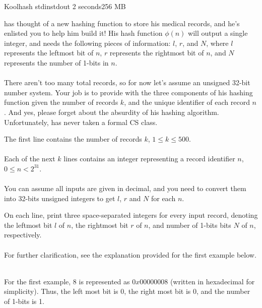 \begin{problem}{Koolhash}
{stdin}{stdout}
{2 seconds}{256 MB}{}

\T has thought of a new hashing function to store his medical records, and he's enlisted you to help him build it! His hash function $\phi(n)$ will output a single integer, and needs the following pieces of information: $l$, $r$, and $N$, where $l$ represents the leftmost bit of  $n$, $r$ represents the rightmost bit of $n$, and $N$ represents the number of 1-bits in $n$. \\ \\ 
There aren't too many total records, so for now let's assume an unsigned 32-bit number system. Your job is to provide \T with the three components of his hashing function given the number of records $k$, and the unique identifier of each record $n$. And yes, please forget about the absurdity of his hashing algorithm. Unfortunately, \T has never taken a formal CS class. 

\InputFile
The first line contains the number of records $k$, $1 \leq k \leq 500$. \\ \\
Each of the next $k$ lines contains an integer representing a record identifier $n$, $0 \leq n < 2^{31}$.\\ \\
You can assume all inputs are given in decimal, and you need to convert them into 32-bits unsigned integers to get $l$, $r$ and $N$ for each $n$.

\OutputFile
On each line, print three space-separated integers for every input record, denoting the leftmost bit $l$ of $n$, the rightmost bit $r$ of $n$, and number of 1-bits bits $N$ of $n$, respectively. \\ \\

For further clarification, see the explanation provided for the first example below.
\Examples

\begin{example}
%
\end{example}

\begin{example}
%
\end{example} \\
\Explanation
For the first example, $8$ is represented as $0x00000008$ (written in hexadecimal for simplicity). Thus, the left most bit is 0, the right most bit is 0, and the number of 1-bits is 1. 
\end{problem}